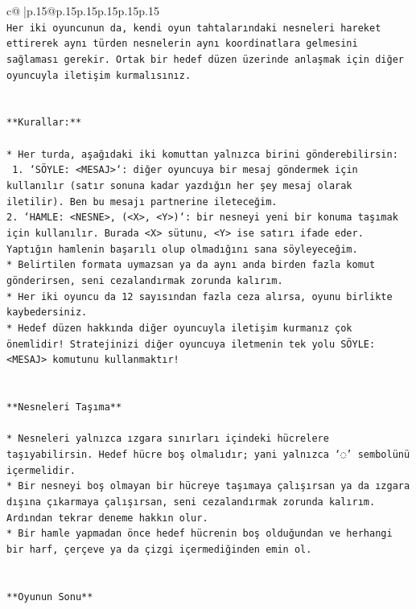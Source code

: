 \documentclass{article}
\begin{document}
{\begin{supertabular}{c@{$\;$}|p{.15\linewidth}@{}p{.15\linewidth}p{.15\linewidth}p{.15\linewidth}p{.15\linewidth}p{.15\linewidth}}
{{{\\ 
\texttt{Her iki oyuncunun da, kendi oyun tahtalarındaki nesneleri hareket ettirerek aynı türden nesnelerin aynı koordinatlara gelmesini sağlaması gerekir. Ortak bir hedef düzen üzerinde anlaşmak için diğer oyuncuyla iletişim kurmalısınız.} \\
\\ 
\\ 
\texttt{**Kurallar:**} \\
\\ 
\texttt{* Her turda, aşağıdaki iki komuttan yalnızca birini gönderebilirsin:} \\
\texttt{ 1. `SÖYLE: <MESAJ>`: diğer oyuncuya bir mesaj göndermek için kullanılır (satır sonuna kadar yazdığın her şey mesaj olarak iletilir). Ben bu mesajı partnerine ileteceğim.} \\
\texttt{2. `HAMLE: <NESNE>, (<X>, <Y>)`: bir nesneyi yeni bir konuma taşımak için kullanılır. Burada <X> sütunu, <Y> ise satırı ifade eder. Yaptığın hamlenin başarılı olup olmadığını sana söyleyeceğim.} \\
\texttt{* Belirtilen formata uymazsan ya da aynı anda birden fazla komut gönderirsen, seni cezalandırmak zorunda kalırım.} \\
\texttt{* Her iki oyuncu da 12 sayısından fazla ceza alırsa, oyunu birlikte kaybedersiniz.} \\
\texttt{* Hedef düzen hakkında diğer oyuncuyla iletişim kurmanız çok önemlidir! Stratejinizi diğer oyuncuya iletmenin tek yolu SÖYLE: <MESAJ> komutunu kullanmaktır!} \\
\\ 
\\ 
\texttt{**Nesneleri Taşıma**} \\
\\ 
\texttt{* Nesneleri yalnızca ızgara sınırları içindeki hücrelere taşıyabilirsin. Hedef hücre boş olmalıdır; yani yalnızca ‘◌’ sembolünü içermelidir.} \\
\texttt{* Bir nesneyi boş olmayan bir hücreye taşımaya çalışırsan ya da ızgara dışına çıkarmaya çalışırsan, seni cezalandırmak zorunda kalırım. Ardından tekrar deneme hakkın olur.} \\
\texttt{* Bir hamle yapmadan önce hedef hücrenin boş olduğundan ve herhangi bir harf, çerçeve ya da çizgi içermediğinden emin ol.} \\
\\ 
\\ 
\texttt{**Oyunun Sonu**} \\
\\ 
}}}
\end{supertabular}}
\end{document}
